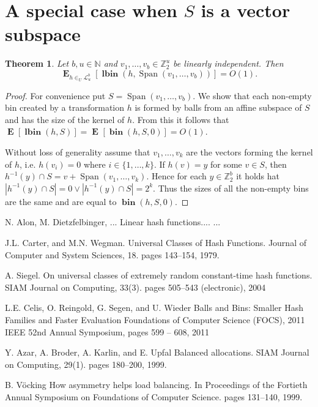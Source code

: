\documentclass{article}
\newcommand{\bin}[3]{\operatorname{\mathbf{bin}}({#1}, {#2}, {#3})}
\newcommand{\lbin}[2]{\operatorname{\mathbf{lbin}}({#1}, {#2})}
\newcommand{\linearmaps}[2]{\mathcal{L}_{#1}^{#2}}
\newcommand{\expects}[2]{\operatorname{\mathbf{E}}_{{#1}}\left[{#2}\right]}
\newcommand{\expect}[1]{\expects{}{#1}}
\newtheorem{theorem}{Theorem}
\begin{document}
\section{A special case when $S$ is a vector subspace}

\begin{theorem}
Let $b, u \in \mathbb{N}$ and $v_1, \dots, v_b \in \mathbb{Z}_2^u$ be linearly independent. Then \[ \expects{h \in_U \linearmaps{u}{b}}{\lbin{h}{\operatorname{Span}(v_1, \dots, v_b)}} = O(1) .\]
\end{theorem}
\begin{proof}
For convenience put $S = \operatorname{Span}(v_1, \dots, v_b)$. 
We show that each non-empty bin created by a transformation $h$ is formed by balls from an affine subspace of $S$ and has the size of the kernel of $h$.
From this it follows that $\expect{\lbin{h}{S}} = \expect{\bin{h}{S}{0}} = O(1)$.

Without loss of generality assume that $v_1, \dots, v_k$ are the vectors forming the kernel of $h$, i.e. $h(v_i) = 0$ where $i \in \{1, \dots, k\}$.
If $h(v) = y$ for some $v \in S$, then $h^{-1}(y) \cap S = v + \operatorname{Span}(v_1, \dots, v_k)$.
Hence for each $y \in \mathbb{Z}_2^b$ it holds hat $|h^{-1}(y) \cap S| = 0 \vee |h^{-1}(y) \cap S| = 2^k$.
Thus the sizes of all the non-empty bins are the same and are equal to $\bin{h}{S}{0}$.
\end{proof}

\begin{thebibliography}{32}
N. Alon, M. Dietzfelbinger, ...
\newblock Linear hash functions....
\newblock ...


J.L. Carter, and M.N. Wegman. 
\newblock Universal Classes of Hash Functions.
\newblock Journal of Computer and System Sciences, 18. pages 143--154, 1979.

A. Siegel. 
\newblock On universal classes of extremely random constant-time hash functions.
\newblock SIAM Journal on Computing, 33(3). pages 505--543 (electronic), 2004

L.E. Celis, O. Reingold, G. Segen, and U. Wieder
\newblock Balls and Bins: Smaller Hash Families and Faster Evaluation
\newblock Foundations of Computer Science (FOCS), 2011 IEEE 52nd Annual Symposium, pages 599 -- 608, 2011

Y. Azar, A. Broder, A. Karlin, and E. Upfal
\newblock Balanced allocations.
\newblock SIAM Journal on Computing, 29(1). pages 180--200, 1999.

B. V\"{o}cking
\newblock How asymmetry helps load balancing.
\newblock In Proceedings of the Fortieth Annual Symposium on Foundations of Computer Science. pages 131--140, 1999.
\end{thebibliography}
\end{document}
